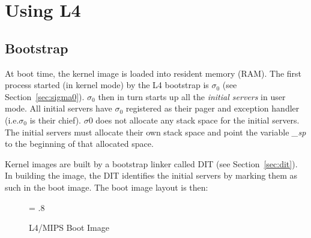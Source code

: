 %




\chapter{\label{c:use}Using L4}



\section{Bootstrap}
\label{sec:bootstrap}


At boot time, the kernel image is loaded into resident memory (RAM).
The first process started (in kernel mode) by the L4 bootstrap is
$\sigma_0$ (see Section~\ref{sec:sigma0}). $\sigma_0$ then in turn
starts up all the \emph{initial servers} in user mode. All initial
servers have $\sigma_0$ registered as their pager and exception
handler (i.e.$\sigma_0$ is their chief). $\sigma0$ does not allocate
any stack space for the initial servers. The initial servers must
allocate their own stack space and point the variable \emph{\_sp} to
the beginning of that allocated space.

Kernel images are built by a bootstrap linker called DIT (see
Section~\ref{sec:dit}). In building the image, the DIT identifies the
initial servers by marking them as such in the boot image. The boot
image layout is then:

\begin{figure}[h]
\begin{center}
\leavevmode
\epsfxsize = .8\textwidth
{}
\end{center}
\caption{L4/MIPS Boot Image}
\label{fig:boot}
\end{figure}

